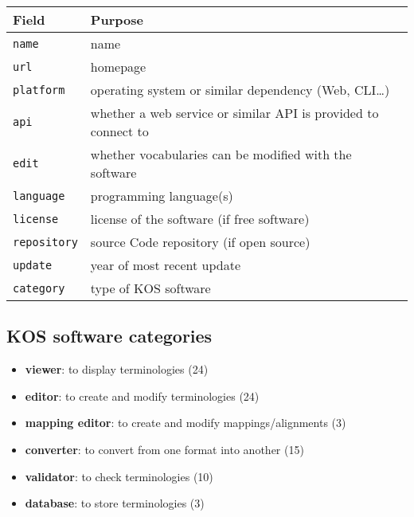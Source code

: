 \documentclass[
  DIV=10]{article}
\providecommand{\tightlist}{%
  \setlength{\itemsep}{0pt}\setlength{\parskip}{0pt}}\usepackage{longtable,booktabs,array}
\begin{document}
\begin{longtable}[]{@{}
  >{\raggedright\arraybackslash}p{}
  >{\raggedright\arraybackslash}p{}@{}}
\toprule\noalign{}
\begin{minipage}[b]{\linewidth}\raggedright
Field
\end{minipage} & \begin{minipage}[b]{\linewidth}\raggedright
Purpose
\end{minipage} \\
\midrule\noalign{}
\endhead
\bottomrule\noalign{}
\endlastfoot
\texttt{name} & name \\
\texttt{url} & homepage \\
\texttt{platform} & operating system or similar dependency (Web,
CLI\ldots) \\
\texttt{api} & whether a web service or similar API is provided to
connect to \\
\texttt{edit} & whether vocabularies can be modified with the
software \\
\texttt{language} & programming language(s) \\
\texttt{license} & license of the software (if free software) \\
\texttt{repository} & source Code repository (if open source) \\
\texttt{update} & year of most recent update \\
\texttt{category} & type of KOS software \\
\end{longtable}

\subsection{KOS software categories}\label{kos-software-categories}

\begin{itemize}
\tightlist
\item
  \textbf{viewer}: to display terminologies (24)
\item
  \textbf{editor}: to create and modify terminologies (24)
\item
  \textbf{mapping editor}: to create and modify mappings/alignments (3)
\item
  \textbf{converter}: to convert from one format into another (15)
\item
  \textbf{validator}: to check terminologies (10)
\item
  \textbf{database}: to store terminologies (3)
\end{itemize}
\end{document}
